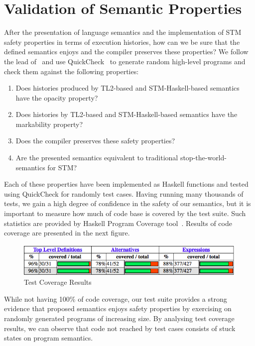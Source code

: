 \documentclass[sigplan, anonymous, review]{acmart}
\theoremstyle{definition}
\begin{document}
\section{Validation of Semantic Properties}

After the presentation of language semantics and the implementation of
STM safety properties in terms of execution histories, how can we
be sure that the defined semantics enjoys and the compiler preserves these
properties? We follow the lead of~\cite{Hu08} and use QuickCheck~\cite{Claessen00} to
generate random high-level programs and check them against the following properties:

\begin{enumerate}
  \item Does histories produced by TL2-based and STM-Haskell-based semantics have the opacity property?
  \item Does histories by TL2-based and STM-Haskell-based semantics have the markability property?
  \item Does the compiler preserves these safety properties? 
  \item Are the presented semantics equivalent to traditional stop-the-world-semantics for STM?
\end{enumerate}

Each of these properties have been implemented as Haskell functions and tested using QuickCheck for randomly test cases.
Having running many thousands of tests, we gain a high degree of confidence in the safety of our semantics, but it is
important to measure how much of code base is covered by the test suite. Such statistics are provided by Haskell Program Coverage
tool~\cite{Gill2007}. Results of code coverage are presented in the next figure.

\begin{figure}[!htb]
\centering
\includegraphics[scale=0.38]{coverage.png}
\caption{Test Coverage Results}
\label{fig:test-coverage}
\end{figure}
While not having 100\% of code coverage, our test suite provides a strong evidence that proposed semantics enjoys
safety properties by exercising on randomly generated programs of increasing size. By analysing test coverage
results, we can observe that code not reached by test cases consists of stuck states on program semantics.
\end{document}
